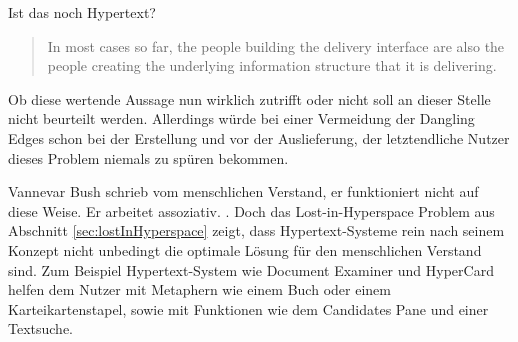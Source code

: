 \begin{section}{Ist das noch Hypertext?}
\begin{quote}
\glqq In most cases so far, the people building the delivery interface are also the people creating the underlying information structure that it is delivering.
\end{quote}

Ob diese wertende Aussage nun wirklich zutrifft oder nicht soll an dieser Stelle nicht beurteilt werden. Allerdings würde bei einer Vermeidung der Dangling Edges schon bei der Erstellung und vor der Auslieferung, der letztendliche Nutzer dieses Problem niemals zu spüren bekommen.

Vannevar Bush schrieb vom menschlichen Verstand, \glqq er funktioniert nicht auf diese Weise. Er arbeitet assoziativ.\grqq{ }\cite{Bush1945} \cite{Life1945}. Doch das Lost-in-Hyperspace Problem aus Abschnitt \ref{sec:lostInHyperspace} zeigt, dass Hypertext-Systeme rein nach seinem Konzept nicht unbedingt die optimale Lösung für den menschlichen Verstand sind. Zum Beispiel Hypertext-System wie Document Examiner und HyperCard helfen dem Nutzer mit Metaphern wie einem Buch oder einem Karteikartenstapel, sowie mit Funktionen wie dem Candidates Pane und einer Textsuche.

\end{section}